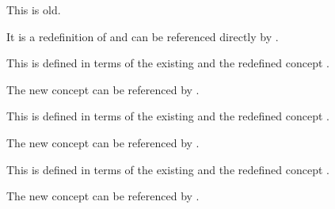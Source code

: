 \documentclass[minimal]{omdoc}
\begin{document}
\begin{module}[name=dfoo]
\begin{definition}[id=dtest.one]
  This  is old.
\end{definition}
It is a redefinition of  and can be referenced directly by
.

\begin{definition}
  This  is defined in terms of the existing
   and the redefined concept .
\end{definition}
The new concept can be referenced by .

\begin{definition}
  This  is defined in terms of the existing
   and the redefined concept .
\end{definition}
The new concept can be referenced by .

\begin{definition}
  This  is defined in
  terms of the existing  and the
  redefined concept .
\end{definition}
The new concept can be referenced by .
\end{module}
\end{document}
